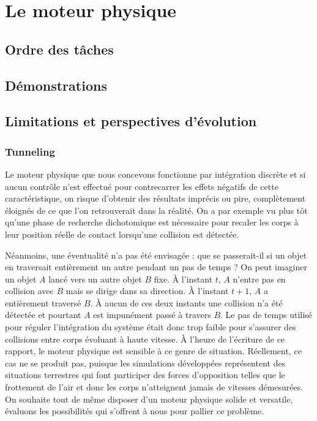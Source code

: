 \section{Le moteur physique}

\subsection{Ordre des tâches}

\subsection{Démonstrations}

\subsection{Limitations et perspectives d'évolution}

\subsubsection{Tunneling}

Le moteur physique que nous concevons fonctionne par intégration
discrète et si aucun contrôle n'est effectué pour contrecarrer les
effets négatifs de cette caractéristique, on risque d'obtenir des
résultats imprécis ou pire, complètement éloignés de ce que l'on
retrouverait dans la réalité. On a par exemple vu plus tôt qu'une
phase de recherche dichotomique est nécessaire pour recaler les corps
à leur position réelle de contact lorsqu'une collision est détectée.

Néanmoins, une éventualité n'a pas été envisagée : que se passerait-il
si un objet en traversait entièrement un autre pendant un pas de temps
? On peut imaginer un objet $A$ lancé vers un autre objet $B$
fixe. \`A l'instant $t$, $A$ n'entre pas en collision avec $B$ mais se
dirige dans sa direction. \`A l'instant $t+1$, $A$ a entièrement
traversé $B$. \`A aucun de ces deux instants une collision n'a été
détectée et pourtant $A$ est impunément passé à travers $B$. Le pas de
temps utilisé pour réguler l'intégration du système était donc trop
faible pour s'assurer des collisions entre corps évoluant à haute
vitesse. \`A l'heure de l'écriture de ce rapport, le moteur physique
est sensible à ce genre de situation. Réellement, ce cas ne se produit
pas, puisque les simulations développées représentent des situations
terrestres qui font participer des forces d'opposition telles que le
frottement de l'air et donc les corps n'atteignent jamais de vitesses
démesurées. On souhaite tout de même disposer d'un moteur physique
solide et versatile, évaluons les possibilités qui s'offrent à nous
pour pallier ce problème.

